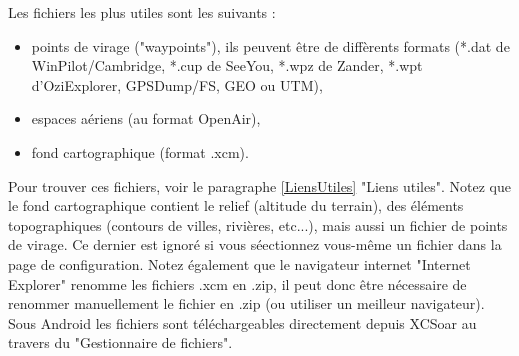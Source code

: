 \documentclass{article}
\begin{document}
Les fichiers les plus utiles sont les suivants :
\begin{itemize}
\item points de virage ("waypoints"), ils peuvent être de diffèrents formats (*.dat de WinPilot/Cambridge, *.cup de SeeYou, *.wpz de Zander, *.wpt d'OziExplorer, GPSDump/FS, GEO ou UTM),
\item espaces aériens (au format OpenAir),
\item fond cartographique (format .xcm).\\
\end{itemize}
%
Pour trouver ces fichiers, voir le paragraphe \ref{LiensUtiles} "Liens utiles". Notez que le fond cartographique contient le relief (altitude du terrain), des éléments topographiques (contours de villes, rivières, etc...), mais aussi un fichier de points de virage. Ce dernier est ignoré si vous séectionnez vous-même un fichier dans la page de configuration. Notez également que le navigateur internet "Internet Explorer" renomme les fichiers .xcm en .zip, il peut donc être nécessaire de renommer manuellement le fichier en .zip (ou utiliser un meilleur navigateur).\\
%
\newline
Sous Android les fichiers sont téléchargeables directement depuis XCSoar au travers du "Gestionnaire de fichiers".\\
%
\end{document}
